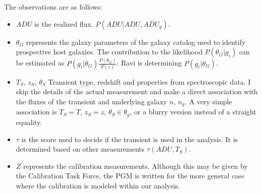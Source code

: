 \documentclass[preprint]{aastex}
\begin{document}
The observations are as follows:
\begin{itemize}
\item ${\mathit{ADU}}$ is the realized flux. $P({\mathit{ADU}} | \overline{\mathit{ADU}}, 
\overline{\mathit{ADU}}_g)$.
\item $\theta_G$ represents the galaxy parameters of the
galaxy catalog used to identify prospective host galaxies.
The contribution to the likelihood $P(\theta_G|g_i)$ can be
estimated as $P(g_i|\theta_G)\frac{P(\theta_G)}{P(z)}$: Ravi is determining $P(g_i|\theta_G)$.
\item ${T}_S$, ${z}_S$, ${\theta}_S$ Transient type, redshift and properties from
spectroscopic data. I skip the details of the actual measurement  and make a direct association
with the fluxes of the transient and underlying galaxy $n$, $n_g$.
A very simple association is ${T}_S = T$, ${z}_S=z$, ${\theta}_S \in \theta_g$,
or a blurry version instead of a straight equality.
\item $\tau$ is the score used to decide if the transient is used in the analysis.  It is
determined based on other measurements $\tau(\mathit{ADU},T_S)$.
\item ${Z}$ represents the calibration measurements.   Although this may be given
by the Calibration Task Force, the PGM is written for the more general case where the calibration
is modeled within our analysis.
\end{itemize}
\end{document}
